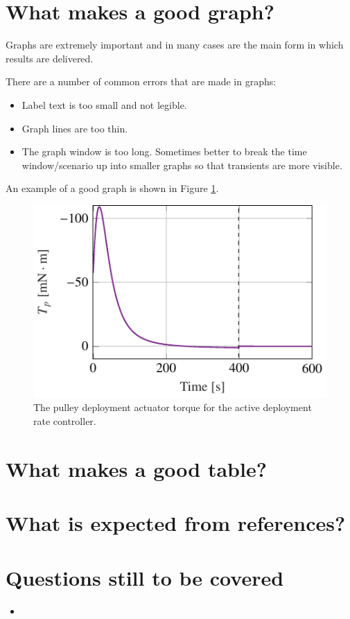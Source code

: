 \documentclass[12pt]{article}
\begin{document}
\section*{What makes a good graph?}
Graphs are extremely important and in many cases are the main form in which results are delivered.


There are a number of common errors that are made in graphs:
\begin{itemize}
	\item Label text is too small and not legible.
	\item Graph lines are too thin.
	\item The graph window is too long.
	Sometimes better to break the time window/scenario up into smaller graphs so that transients are more visible.
\end{itemize}

An example of a good graph is shown in Figure \ref{fig:good_graphs}.

\begin{figure}
	\centering
	\includegraphics[width=0.5\linewidth]{figures/LdCont_T_p}
	\caption{The pulley deployment actuator torque for the active deployment rate controller.}
	\label{fig:good_graphs}
\end{figure}

\section*{What makes a good table?}

\section*{What is expected from references?}

\section*{Questions still to be covered}
\begin{itemize}
	\item 
\end{itemize}
\end{document}
